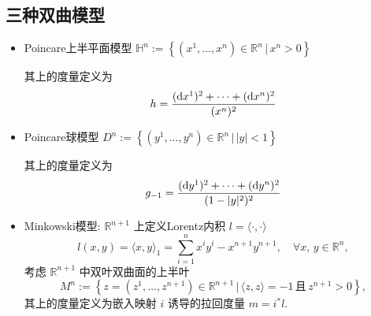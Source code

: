 \documentclass{book}
\newcommand{\md}{{\rm d}}
\begin{document}
    \subsection{三种双曲模型}
        \begin{itemize}
            \item Poincare上半平面模型 $\mathbb{H}^n:=\left\{\left(x^1,\dots,x^n\right)\in\mathbb{R}^n\,\Big|\,x^n>0\right\}$  
            
            其上的度量定义为
            \begin{equation*}
                h=\frac{(\md x^1)^2+\cdots+(\md x^n)^2}{(x^n)^2}
            \end{equation*}

            \item Poincare球模型 $D^n:=\left\{\left(y^1,\dots,y^n\right)\in\mathbb{R}^n\,\Big|\,|y|<1\right\}$
            
            其上的度量定义为
            \begin{equation*}
                g_{-1}=\frac{(\md y^1)^2+\cdots+(\md y^n)^2}{(1-|y|^2)^2}
            \end{equation*}

            \item Minkowski模型: $\mathbb{R}^{n+1}$ 上定义Lorentz内积 $l=\langle\cdot,\cdot\rangle$
            \begin{equation*}
                l(x,y)=\langle x,y\rangle_1=\sum_{i=1}^{n}x^iy^i-x^{n+1}y^{n+1},\quad\forall x,\,y\in\mathbb{R}^n,
            \end{equation*}
            考虑 $\mathbb{R}^{n+1}$ 中双叶双曲面的上半叶
            \begin{equation*}
                M^n:=\left\{z=\left(z^1,\dots,z^{n+1}\right)\in\mathbb{R}^{n+1}\,\Big|\,\langle z,z\rangle=-1\,\text{且}\,z^{n+1}>0\right\},
            \end{equation*}
            其上的度量定义为嵌入映射 $i$ 诱导的拉回度量 $m=i^*l$.
        \end{itemize}
\end{document}
